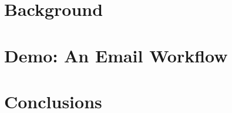 \section[Background]{Background}




\section[Demo]{Demo: An Email Workflow}


% 

\section[Concl]{Conclusions}

